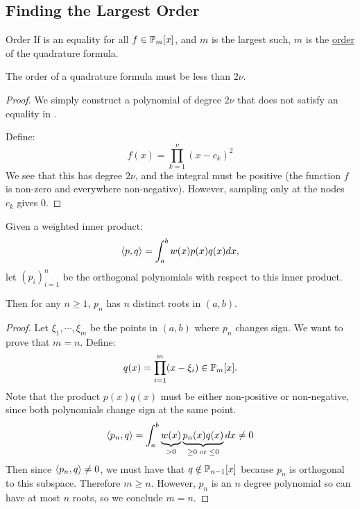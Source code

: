 \documentclass[../Main.tex]{subfiles}
\begin{document}
\subsection{Finding the Largest Order}
\begin{definition}{Order}
    If  is an equality for all $f \in \P_m[x]$, and $m$ is the largest such, $m$ is the \underline{order} of the quadrature formula.
\end{definition}
\begin{proposition}
    The order of a quadrature formula must be less than $2\nu$.
    \label{propOrderNotDouble}
\end{proposition}
\begin{proof}
    We simply construct a polynomial of degree $2\nu$ that does not satisfy an equality in .

    Define:
    \begin{equation*}
        f(x) = \prod_{k=1}^{\nu} (x - c_k)^2
    \end{equation*}
    We see that this has degree $2\nu$, and the integral must be positive (the function $f$ is non-zero and everywhere non-negative). However, sampling only at the nodes $c_k$ gives $0$.
\end{proof}
\begin{lemma}
    Given a weighted inner product:
    \begin{equation*}
        \inn{p}{q} = \int_{a}^{b} w(x) p(x) q(x) dx,
    \end{equation*}
    let $(p_i)_{i=1}^n$ be the orthogonal polynomials with respect to this inner product.

    Then for any $n \geq 1$, $p_n$ has $n$ distinct roots in $(a, b)$.
    \label{lemOrthogNRoots}
\end{lemma}
\begin{proof}
    Let $\xi_1, \cdots, \xi_m$ be the points in $(a, b)$ where $p_n$ changes sign. We want to prove that $m = n$. Define:
    \begin{equation*}
        q(x) = \prod_{i=1}^{m} (x - \xi_i) \in \P_m[x].
    \end{equation*}
    Note that the product $p(x) q(x)$ must be either non-positive or non-negative, since both polynomials change sign at the same point.
    \begin{equation*}
        \inn{p_n}{q} = \int_{a}^{b} \underbrace{w(x)}_{>0} \underbrace{p_n(x) q(x)}_{\geq 0 \text{ or } \leq 0} dx \neq 0  \\
    \end{equation*}
    Then since $\inn{p_n}{q} \neq 0$, we must have that $q \notin \P_{n-1}[x]$ because $p_n$ is orthogonal to this subspace.
    Therefore $m \geq n$. However, $p_n$ is an $n$ degree polynomial so can have at most $n$ roots, so we conclude $m = n$.
\end{proof}
\end{document}
